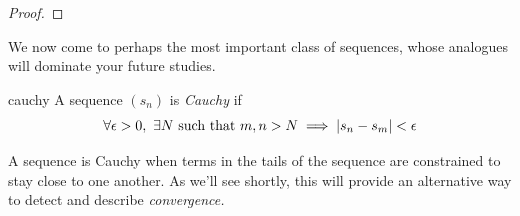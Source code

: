 \begin{proof}
\end{proof}




We now come to perhaps the most important class of sequences, whose analogues will dominate your future studies.

\begin{defn}{}{cauchy}
	A sequence $(s_n)$ is \emph{Cauchy\footnotemark} if
	\[
		\forall\epsilon>0,\ \exists N\ \text{such that}\  m,n>N\implies\left| s_n-s_m\right|<\epsilon
	\]
\end{defn}


A sequence is Cauchy when terms in the tails of the sequence are constrained to stay close to one another. As we'll see shortly, this will provide an alternative way to detect and describe \emph{convergence.}


